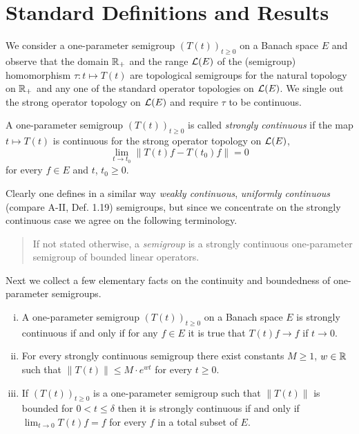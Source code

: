 \section{Standard Definitions and Results}\label{sec:a1-1}
We consider a one-parameter semigroup $(T(t))_{t \geq 0}$ on a Banach space $E$ 
and observe that the domain $\mathbb{R}_{+}$ and the range $\mathcal{L}(E)$ of the (semigroup) homomorphism $\tau \colon t \mapsto T(t)$ are topological semigroups for the natural topology on $\mathbb{R}_{+}$ and any one of the standard operator topologies on $\mathcal{L}(E)$.
We single out the strong operator topology on $\mathcal{L}(E)$ and require $\tau$ to be continuous.
\begin{definition}\label{def:a1-1.1}
A one-parameter semigroup $(T(t))_{t\geq0}$ is called \emph{strongly continuous} if the map $t \mapsto T(t)$ is continuous for the strong operator topology on $\mathcal{L}(E)$, \eg
\[
	\lim_{t\to t_{0}} \|T(t)f - T(t_{0})f\| = 0
\]
for every $f \in E$ and $t$, $t_{0} \geq 0$.
\end{definition}
Clearly one defines in a similar way \emph{weakly continuous}, \resp \emph{uniformly continuous} (compare A-II, Def. 1.19) semigroups, but since we concentrate on the strongly continuous case we agree on the following terminology.
\begin{quote}
If not stated otherwise, a \emph{semigroup} is a strongly continuous one-parameter semigroup of bounded linear operators.
\end{quote}
Next we collect a few elementary facts on the continuity and boundedness of one-parameter semigroups.
\begin{remarks}\label{rem:a1-1.2}
\begin{enumerate}[(i), wide, labelsep=1em, itemindent=\parindent]

\item 
A one-parameter semigroup $(T(t))_{t \geq 0}$ on a Banach space $E$ is strongly continuous if and only if for any $f \in E$ it is true that $T(t)f \to f$ if $t \to 0$.

\item 
For every strongly continuous semigroup there exist constants $M \geq 1$, $w \in \mathbb{R}$ such that $\|T(t)\| \leq M \cdot e^{wt}$ for every $t \geq 0$.
\item If $(T(t))_{t\geq0}$ is a one-parameter semigroup such that $\|T(t)\|$ is bounded for $0 < t \leq \delta$ then it is strongly continuous if and only if $\lim_{t \to 0} T(t)f = f$ for every $f$ in a total subset of $E$.
\end{enumerate}
\end{remarks}
